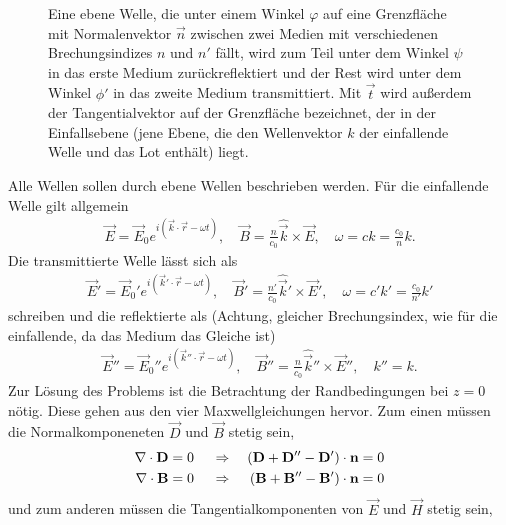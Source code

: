 \begin{figure}[htb]
    \centering
    \tfigReflectionRefractionPlaneWave
    \caption{Eine ebene Welle, die unter einem Winkel $\varphi$ auf eine Grenzfläche mit Normalenvektor $\vec n$ zwischen zwei Medien mit verschiedenen Brechungsindizes $n$ und $n'$ fällt,
        wird zum Teil unter dem Winkel $\psi$ in das erste Medium zurückreflektiert und der Rest wird unter dem Winkel $\phi'$ in das zweite Medium transmittiert. Mit $\vec t$ wird außerdem der Tangentialvektor auf der Grenzfläche bezeichnet, der in der Einfallsebene (jene Ebene, die den Wellenvektor $k$ der einfallende Welle und das Lot enthält) liegt. }
    \label{fig:reflection_refraction_plane_wave}
\end{figure}

Alle Wellen sollen durch ebene Wellen beschrieben werden. Für die einfallende Welle gilt allgemein
\begin{align*}
    \vec E =\vec E_0 e^{i(\vec k\cdot\vec r-\omega t)}, \quad \vec B =\frac{n}{c_0}\hat{\vec k}\times\vec E, \quad\omega = ck=\frac{c_0}{n}k.
\end{align*}
Die transmittierte Welle lässt sich als
\begin{align*}
    \vec E' =\vec E_0' e^{i(\vec k'\cdot\vec r-\omega t)}, \quad \vec B'  =\frac{n'}{c_0}\hat{\vec k}'\times\vec E', \quad \omega = c'k'=\frac{c_0}{n'}k'
\end{align*}
schreiben und die reflektierte als (Achtung, gleicher Brechungsindex, wie für die einfallende, da das Medium das Gleiche ist)
\begin{align*}
    \vec E'' =\vec E_0'' e^{i(\vec k''\cdot\vec r-\omega t)}, \quad \vec B''  =\frac{n}{c_0}\hat{\vec k}''\times\vec E'', \quad k''  =k.
\end{align*}
Zur Lösung des Problems ist die Betrachtung der Randbedingungen bei $z=0$ nötig.
Diese gehen aus den vier Maxwellgleichungen hervor.
Zum einen müssen die Normalkomponeneten $\vec D$ und $\vec B$ stetig sein,
\begin{align}
    \label{eq:ebene_welle_RB_stetige_normalkomponenten}
    \begin{aligned}
        \nabla\cdot \mathbf{D} & =0 &  & \;\Rightarrow\; & \left(\mathbf{D}+\mathbf{D}''-\mathbf{D}'\right)\cdot \mathbf{n} & =0 \\
        \nabla\cdot \mathbf{B} & =0 &  & \;\Rightarrow\; & \left(\mathbf{B}+\mathbf{B}''-\mathbf{B}'\right)\cdot \mathbf{n} & =0
    \end{aligned}
\end{align}
und zum anderen müssen die Tangentialkomponenten von $\vec E$ und $\vec H$ stetig sein,
